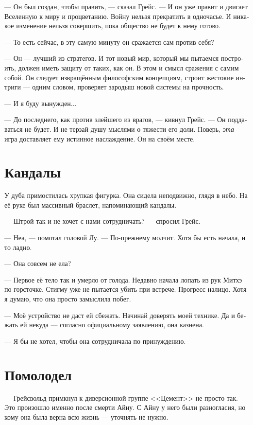 \documentclass[a4paper,12pt,fleqn]{book}\usepackage{polyglossia}\setdefaultlanguage[babelshorthands=true]{russian}\setotherlanguage{english}\defaultfontfeatures{Ligatures=TeX,Mapping=tex-text}\usepackage{xcolor}\newcommand{\ml}[3]{#2}
\begin{document}
{--- Он был создан, чтобы править, --- сказал Грейс.
--- И он уже правит и двигает Вселенную к миру и процветанию.
Войну нельзя прекратить в одночасье.
И никакое изменение нельзя совершить, пока общество не будет к нему готово.

--- То есть сейчас, в эту самую минуту он сражается сам против себя?

--- Он --- лучший из стратегов.
И тот новый мир, который мы пытаемся построить, должен иметь защиту от таких, как он.
В этом и смысл сражения с самим собой.
Он следует извращённым философским концепциям, строит жестокие интриги --- одним словом, проверяет зародыш новой системы на прочность.

--- И я буду вынужден...

--- До последнего, как против злейшего из врагов, --- кивнул Грейс.
--- Он поддаваться не будет.
И не терзай душу мыслями о тяжести его доли.
Поверь, \emph{эта} игра доставляет ему истинное наслаждение.
Он на своём месте.

\section{Кандалы}

У дуба примостилась хрупкая фигурка.
Она сидела неподвижно, глядя в небо.
На её руке был массивный браслет, напоминающий кандалы.

--- Штрой так и не хочет с нами сотрудничать? --- спросил Грейс.

--- Неа, --- помотал головой Лу.
--- По-прежнему молчит.
Хотя бы есть начала, и то ладно.

--- Она совсем не ела?

--- Первое её тело так и умерло от голода.
Недавно начала лопать из рук Митхэ по горсточке.
Стигму уже не пытается убить при встрече.
Прогресс налицо.
Хотя я думаю, что она просто замыслила побег.

--- Моё устройство не даст ей сбежать.
Начинай доверять моей технике.
Да и бежать ей некуда --- согласно официальному заявлению, она казнена.

--- Я бы не хотел, чтобы она сотрудничала по принуждению.

\section{Помолодел}

--- Грейсвольд примкнул к диверсионной группе <<Цемент>> не просто так.
Это произошло именно после смерти Айну.
С Айну у него были разногласия, но кому она была верна всю жизнь --- уточнять не нужно.

}
\end{document}
